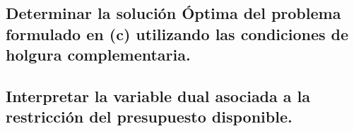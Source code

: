\documentclass[10pt, a4paper]{article}
\begin{document}
		\subsection{Determinar la solución Óptima del problema formulado en (c) utilizando las condiciones de holgura complementaria.}

			\paragraph{}


		\subsection{Interpretar la variable dual asociada a la restricción del presupuesto disponible.}

			\paragraph{}
\end{document}
